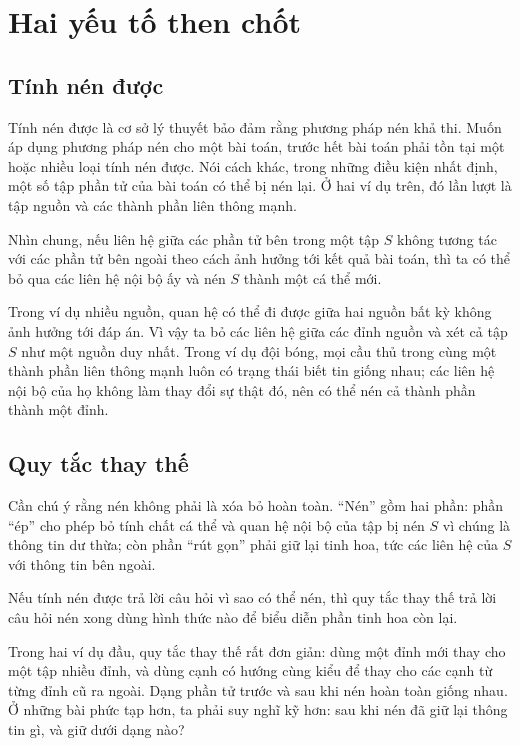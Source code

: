 \documentclass[11pt]{article}
\begin{document}
\section{Hai yếu tố then chốt}

\subsection{Tính nén được}

Tính nén được là cơ sở lý thuyết bảo đảm rằng phương pháp nén khả thi.
Muốn áp dụng phương pháp nén cho một bài toán, trước hết bài toán phải tồn
tại một hoặc nhiều loại tính nén được. Nói cách khác, trong những điều kiện
nhất định, một số tập phần tử của bài toán có thể bị nén lại. Ở hai ví dụ
trên, đó lần lượt là tập nguồn và các thành phần liên thông mạnh.

Nhìn chung, nếu liên hệ giữa các phần tử bên trong một tập $S$ không tương
tác với các phần tử bên ngoài theo cách ảnh hưởng tới kết quả bài toán, thì ta
có thể bỏ qua các liên hệ nội bộ ấy và nén $S$ thành một cá thể mới.

Trong ví dụ nhiều nguồn, quan hệ có thể đi được giữa hai nguồn bất kỳ không
ảnh hưởng tới đáp án. Vì vậy ta bỏ các liên hệ giữa các đỉnh nguồn và xét cả
tập $S$ như một nguồn duy nhất. Trong ví dụ đội bóng, mọi cầu thủ trong cùng
một thành phần liên thông mạnh luôn có trạng thái biết tin giống nhau; các
liên hệ nội bộ của họ không làm thay đổi sự thật đó, nên có thể nén cả thành
phần thành một đỉnh.

\subsection{Quy tắc thay thế}

Cần chú ý rằng nén không phải là xóa bỏ hoàn toàn. ``Nén'' gồm hai phần: phần
``ép'' cho phép bỏ tính chất cá thể và quan hệ nội bộ của tập bị nén $S$ vì
chúng là thông tin dư thừa; còn phần ``rút gọn'' phải giữ lại tinh hoa, tức
các liên hệ của $S$ với thông tin bên ngoài.

Nếu tính nén được trả lời câu hỏi vì sao có thể nén, thì quy tắc thay thế trả
lời câu hỏi nén xong dùng hình thức nào để biểu diễn phần tinh hoa còn lại.

Trong hai ví dụ đầu, quy tắc thay thế rất đơn giản: dùng một đỉnh mới thay cho
một tập nhiều đỉnh, và dùng cạnh có hướng cùng kiểu để thay cho các cạnh từ
từng đỉnh cũ ra ngoài. Dạng phần tử trước và sau khi nén hoàn toàn giống
nhau. Ở những bài phức tạp hơn, ta phải suy nghĩ kỹ hơn: sau khi nén đã giữ
lại thông tin gì, và giữ dưới dạng nào?
\end{document}

